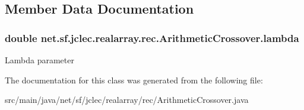 \subsection{Member Data Documentation}
\hypertarget{classnet_1_1sf_1_1jclec_1_1realarray_1_1rec_1_1_arithmetic_crossover_ab29f2d1172e5106746b24cc9fa9e1c24}{
\subsubsection[{lambda}]{\setlength{\rightskip}{0pt plus 5cm}double net.\-sf.\-jclec.\-realarray.\-rec.\-Arithmetic\-Crossover.\-lambda\hspace{0.3cm}{\ttfamily [protected]}}}\label{classnet_1_1sf_1_1jclec_1_1realarray_1_1rec_1_1_arithmetic_crossover_ab29f2d1172e5106746b24cc9fa9e1c24}
Lambda parameter 

The documentation for this class was generated from the following file\-:\begin{DoxyCompactItemize}
\item 
src/main/java/net/sf/jclec/realarray/rec/Arithmetic\-Crossover.\-java\end{DoxyCompactItemize}
